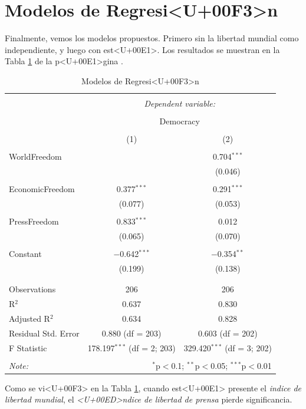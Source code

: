 \documentclass{article}
\begin{document}
\clearpage

\section{Modelos de Regresi<U+00F3>n}

Finalmente, vemos los modelos propuestos. Primero sin la libertad mundial como independiente, y luego con est<U+00E1>. Los resultados se muestran en la Tabla \ref{regresiones} de la p<U+00E1>gina \pageref{regresiones}.



\begin{table}[!htbp] \centering 
  \caption{Modelos de Regresi<U+00F3>n} 
  \label{regresiones} 
\begin{tabular}{@{\extracolsep{5pt}}lcc} 
\\[-1.8ex]\hline 
\hline \\[-1.8ex] 
 & \multicolumn{2}{c}{\textit{Dependent variable:}} \\ 
\cline{2-3} 
\\[-1.8ex] & \multicolumn{2}{c}{Democracy} \\ 
\\[-1.8ex] & (1) & (2)\\ 
\hline \\[-1.8ex] 
 WorldFreedom &  & 0.704$^{***}$ \\ 
  &  & (0.046) \\ 
  & & \\ 
 EconomicFreedom & 0.377$^{***}$ & 0.291$^{***}$ \\ 
  & (0.077) & (0.053) \\ 
  & & \\ 
 PressFreedom & 0.833$^{***}$ & 0.012 \\ 
  & (0.065) & (0.070) \\ 
  & & \\ 
 Constant & $-$0.642$^{***}$ & $-$0.354$^{**}$ \\ 
  & (0.199) & (0.138) \\ 
  & & \\ 
\hline \\[-1.8ex] 
Observations & 206 & 206 \\ 
R$^{2}$ & 0.637 & 0.830 \\ 
Adjusted R$^{2}$ & 0.634 & 0.828 \\ 
Residual Std. Error & 0.880 (df = 203) & 0.603 (df = 202) \\ 
F Statistic & 178.197$^{***}$ (df = 2; 203) & 329.420$^{***}$ (df = 3; 202) \\ 
\hline 
\hline \\[-1.8ex] 
\textit{Note:}  & \multicolumn{2}{r}{$^{*}$p$<$0.1; $^{**}$p$<$0.05; $^{***}$p$<$0.01} \\ 
\end{tabular} 
\end{table} 
Como se vi<U+00F3> en la Tabla \ref{regresiones}, cuando est<U+00E1> presente el \emph{indice de libertad mundial}, el \emph{<U+00ED>ndice de libertad de prensa} pierde significancia.
\end{document}
